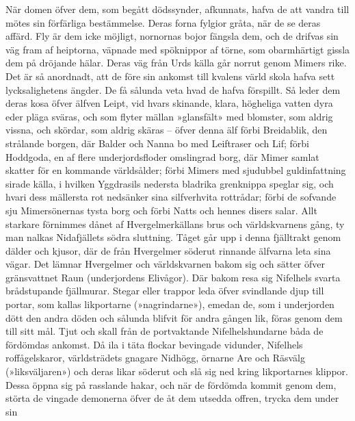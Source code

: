 När domen öfver dem, som begått dödssynder, afkunnats, hafva de att
vandra till mötes sin förfärliga bestämmelse. Deras forna fylgior gråta,
när de se deras affärd. Fly är dem icke möjligt, nornornas bojor fängsla
dem, och de drifvas sin väg fram af heiptorna, väpnade med spöknippor af
törne, som obarmhärtigt gissla dem på dröjande hälar. Deras väg från
Urds källa går norrut genom Mimers rike. Det är så anordnadt, att de
före sin ankomst till kvalens värld skola hafva sett lycksalighetens
ängder. De få sålunda veta hvad de hafva förspillt. Så leder dem deras
kosa öfver älfven Leipt, vid hvars skinande, klara, högheliga vatten
dyra eder pläga sväras, och som flyter mällan »glansfält» med blomster,
som aldrig vissna, och skördar, som aldrig skäras -- öfver denna älf
förbi Breidablik, den strålande borgen, där Balder och Nanna bo med
Leiftraser och Lif; förbi Hoddgoda, en af flere underjordsfloder
omslingrad borg, där Mimer samlat skatter för en kommande världsålder;
förbi Mimers med sjudubbel guldinfattning sirade källa, i hvilken
Yggdrasils nedersta bladrika grenknippa speglar sig, och hvari dess
mällersta rot nedsänker sina silfverhvita rottrådar; förbi de sofvande
sju Mimersönernas tysta borg och förbi Natts och hennes
\protect\hypertarget{lb1625905.xhtmlux5cux23start187}{}{}\protect\hypertarget{lb1625905.xhtmlux5cux23start187-a}{}{}\protect\hypertarget{lb1625905.xhtmlux5cux23start187-b}{}{}\protect\hypertarget{lb1625905.xhtmlux5cux23start187-c}{}{}\protect\hypertarget{lb1625905.xhtmlux5cux23start187-d}{}{}
disers salar. Allt starkare förnimmes dånet af Hvergelmerkällans brus
och världskvarnens gång, ty man nalkas Nidafjällets södra sluttning.
Tåget går upp i denna fjälltrakt genom dälder och kjusor, där de från
Hvergelmer söderut rinnande älfvarna leta sina vägar. Det lämnar
Hvergelmer och världskvarnen bakom sig och sätter öfver gränsvattnet
Raun (underjordens Elivågor). Där bakom resa sig Nifelhels svarta
brådstupande fjällmurar. Stegar eller trappor leda öfver svindlande djup
till portar, som kallas likportarne (»nagrindarne»), emedan de, som i
underjorden dött den andra döden och sålunda blifvit för andra gången
lik, föras genom dem till sitt mål. Tjut och skall från de portvaktande
Nifelhelshundarne båda de fördömdas ankomst. Då ila i täta flockar
bevingade vidunder, Nifelhels roffågelskaror, världsträdets gnagare
Nidhögg, örnarne Are och Räsvälg (»liksväljaren») och deras likar
söderut och slå sig ned kring likportarnes klippor. Dessa öppna sig på
rasslande hakar, och när de fördömda kommit genom dem, störta de vingade
demonerna öfver de åt dem utsedda offren, trycka dem under sin

